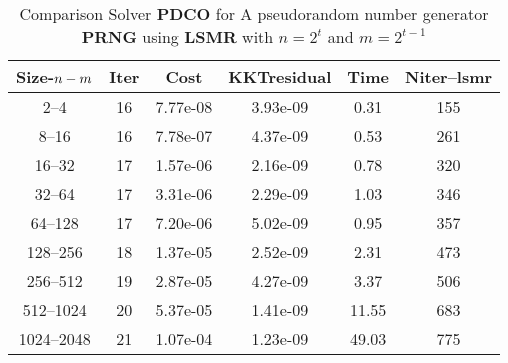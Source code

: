 \documentclass[letterpaper,12pt,oneside,final]{book}
\begin{document}
\begin{table}
\caption{Comparison Solver   {\bf PDCO} for  A pseudorandom number generator {\bf PRNG } using {\bf LSMR} with  $n=2^{t}$ and $m=2^{t-1}$} 
\begin{center}
\begin{tabular}{|*{6}{c}|} \hline
Size-$n\--m$ & \multicolumn{1}{c}{Iter} & \multicolumn{1}{c}{Cost}& \multicolumn{1}{c}{KKTresidual} & \multicolumn{1}{c}{Time} & \multicolumn{1}{c|}{Niter--lsmr} \\ 
\hline
2--4 &16& 7.77e-08& 3.93e-09& 0.31& 155 \\ 
8--16 &16& 7.78e-07& 4.37e-09& 0.53& 261 \\ 
16--32 &17& 1.57e-06& 2.16e-09& 0.78& 320 \\ 
32--64 &17& 3.31e-06& 2.29e-09& 1.03& 346 \\ 
64--128 &17& 7.20e-06& 5.02e-09& 0.95& 357 \\ 
128--256 &18& 1.37e-05& 2.52e-09& 2.31& 473 \\ 
256--512 &19& 2.87e-05& 4.27e-09& 3.37& 506 \\ 
512--1024 &20& 5.37e-05& 1.41e-09& 11.55& 683 \\ 
1024--2048 &21& 1.07e-04& 1.23e-09& 49.03& 775 \\
\hline
\end{tabular}
\end{center}
\end{table}
\end{document}

